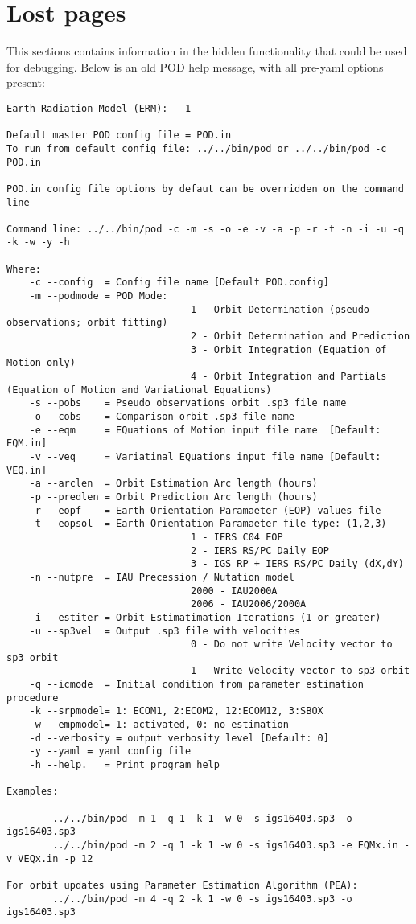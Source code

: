 \chapter{Lost pages}
\label{ch:lost pages}
This sections contains information in the hidden functionality that could be used for debugging.
Below is an old POD help message, with all pre-yaml options present:
\begin{verbatim}
Earth Radiation Model (ERM):   1

Default master POD config file = POD.in
To run from default config file: ../../bin/pod or ../../bin/pod -c POD.in

POD.in config file options by defaut can be overridden on the command line

Command line: ../../bin/pod -c -m -s -o -e -v -a -p -r -t -n -i -u -q -k -w -y -h 

Where: 
    -c --config  = Config file name [Default POD.config]
    -m --podmode = POD Mode:
                                1 - Orbit Determination (pseudo-observations; orbit fitting)
                                2 - Orbit Determination and Prediction
                                3 - Orbit Integration (Equation of Motion only)
                                4 - Orbit Integration and Partials (Equation of Motion and Variational Equations)
    -s --pobs    = Pseudo observations orbit .sp3 file name
    -o --cobs    = Comparison orbit .sp3 file name
    -e --eqm     = EQuations of Motion input file name  [Default: EQM.in]
    -v --veq     = Variatinal EQuations input file name [Default: VEQ.in]
    -a --arclen  = Orbit Estimation Arc length (hours)
    -p --predlen = Orbit Prediction Arc length (hours)
    -r --eopf    = Earth Orientation Paramaeter (EOP) values file
    -t --eopsol  = Earth Orientation Paramaeter file type: (1,2,3)
                                1 - IERS C04 EOP
                                2 - IERS RS/PC Daily EOP
                                3 - IGS RP + IERS RS/PC Daily (dX,dY)
    -n --nutpre  = IAU Precession / Nutation model
                                2000 - IAU2000A
                                2006 - IAU2006/2000A
    -i --estiter = Orbit Estimatimation Iterations (1 or greater)
    -u --sp3vel  = Output .sp3 file with velocities
                                0 - Do not write Velocity vector to sp3 orbit
                                1 - Write Velocity vector to sp3 orbit
    -q --icmode  = Initial condition from parameter estimation procedure
    -k --srpmodel= 1: ECOM1, 2:ECOM2, 12:ECOM12, 3:SBOX
    -w --empmodel= 1: activated, 0: no estimation
    -d --verbosity = output verbosity level [Default: 0]
    -y --yaml = yaml config file
    -h --help.   = Print program help

Examples:

        ../../bin/pod -m 1 -q 1 -k 1 -w 0 -s igs16403.sp3 -o igs16403.sp3 
        ../../bin/pod -m 2 -q 1 -k 1 -w 0 -s igs16403.sp3 -e EQMx.in -v VEQx.in -p 12

For orbit updates using Parameter Estimation Algorithm (PEA):
        ../../bin/pod -m 4 -q 2 -k 1 -w 0 -s igs16403.sp3 -o igs16403.sp3
\end{verbatim}